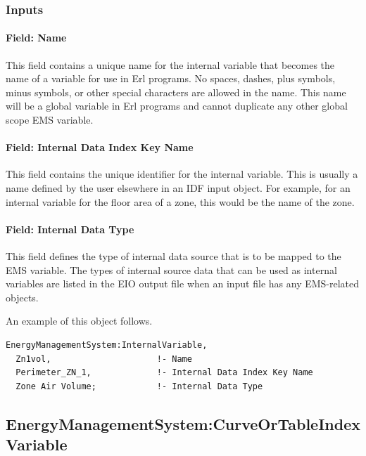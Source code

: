 \subsubsection{Inputs}\label{inputs-8-006}

\paragraph{Field: Name}\label{field-name-8-005}

This field contains a unique name for the internal variable that becomes the name of a variable for use in Erl programs. No spaces, dashes, plus symbols, minus symbols, or other special characters are allowed in the name. This name will be a global variable in Erl programs and cannot duplicate any other global scope EMS variable.

\paragraph{Field: Internal Data Index Key Name}\label{field-internal-data-index-key-name}

This field contains the unique identifier for the internal variable. This is usually a name defined by the user elsewhere in an IDF input object. For example, for an internal variable for the floor area of a zone, this would be the name of the zone.

\paragraph{Field: Internal Data Type}\label{field-internal-data-type}

This field defines the type of internal data source that is to be mapped to the EMS variable. The types of internal source data that can be used as internal variables are listed in the EIO output file when an input file has any EMS-related objects.

An example of this object follows.

\begin{lstlisting}
EnergyManagementSystem:InternalVariable,
  Zn1vol,                     !- Name
  Perimeter_ZN_1,             !- Internal Data Index Key Name
  Zone Air Volume;            !- Internal Data Type
\end{lstlisting}

\subsection{EnergyManagementSystem:CurveOrTableIndexVariable}\label{energymanagementsystemcurveortableindexvariable}

